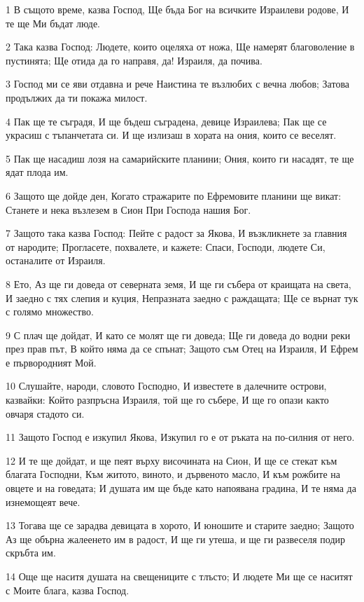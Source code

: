 \par 1 В същото време, казва Господ, Ще бъда Бог на всичките Израилеви родове, И те ще Ми бъдат люде.
\par 2 Така казва Господ: Людете, които оцеляха от ножа, Ще намерят благоволение в пустинята; Ще отида да го направя, да! Израиля, да почива.
\par 3 Господ ми се яви отдавна и рече Наистина те възлюбих с вечна любов; Затова продължих да ти покажа милост.
\par 4 Пак ще те съградя, И ще бъдеш съградена, девице Израилева; Пак ще се украсиш с тъпанчетата си. И ще излизаш в хората на ония, които се веселят.
\par 5 Пак ще насадиш лозя на самарийските планини; Ония, които ги насадят, те ще ядат плода им.
\par 6 Защото ще дойде ден, Когато стражарите по Ефремовите планини ще викат: Станете и нека възлезем в Сион При Господа нашия Бог.
\par 7 Защото така казва Господ: Пейте с радост за Якова, И възкликнете за главния от народите; Прогласете, похвалете, и кажете: Спаси, Господи, людете Си, останалите от Израиля.
\par 8 Ето, Аз ще ги доведа от северната земя, И ще ги събера от краищата на света, И заедно с тях слепия и куция, Непразната заедно с раждащата; Ще се върнат тук с голямо множество.
\par 9 С плач ще дойдат, И като се молят ще ги доведа; Ще ги доведа до водни реки през прав път, В който няма да се спънат; Защото съм Отец на Израиля, И Ефрем е първородният Мой.
\par 10 Слушайте, народи, словото Господно, И известете в далечните острови, казвайки: Който разпръсна Израиля, той ще го събере, И ще го опази както овчаря стадото си.
\par 11 Защото Господ е изкупил Якова, Изкупил го е от ръката на по-силния от него.
\par 12 И те ще дойдат, и ще пеят върху височината на Сион, И ще се стекат към благата Господни, Към житото, виното, и дървеното масло, И към рожбите на овцете и на говедата; И душата им ще бъде като напоявана градина, И те няма да изнемощеят вече.
\par 13 Тогава ще се зарадва девицата в хорото, И юношите и старите заедно; Защото Аз ще обърна жалеенето им в радост, И ще ги утеша, и ще ги развеселя подир скръбта им.
\par 14 Още ще наситя душата на свещениците с тлъсто; И людете Ми ще се наситят с Моите блага, казва Господ.
